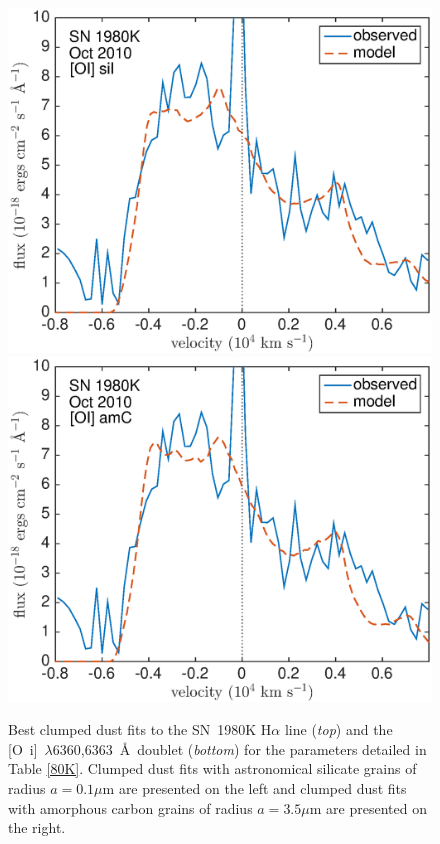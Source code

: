 \begin{figure}
\includegraphics[scale=0.4,clip=true, trim=20 0 40 20]{chapters/chapter6/figs/80K/clumped/OI}
\includegraphics[scale=0.4,clip=true, trim=20 0 40 20]{chapters/chapter6/figs/80K/clumped/OI_amC}
\caption{Best clumped dust fits to the SN~1980K H$\alpha$ line ({\em top}) and the [O~{\sc i}]~$\lambda$6360,6363~\AA\ doublet ({\em bottom}) for the parameters detailed in Table \ref{80K}.  Clumped dust fits with astronomical silicate grains of radius $a=0.1 \mu$m are presented on the left and clumped dust fits with amorphous carbon grains of radius $a=3.5 \mu$m are presented on the right.}
\label{80K_clumped}
\end{figure}

